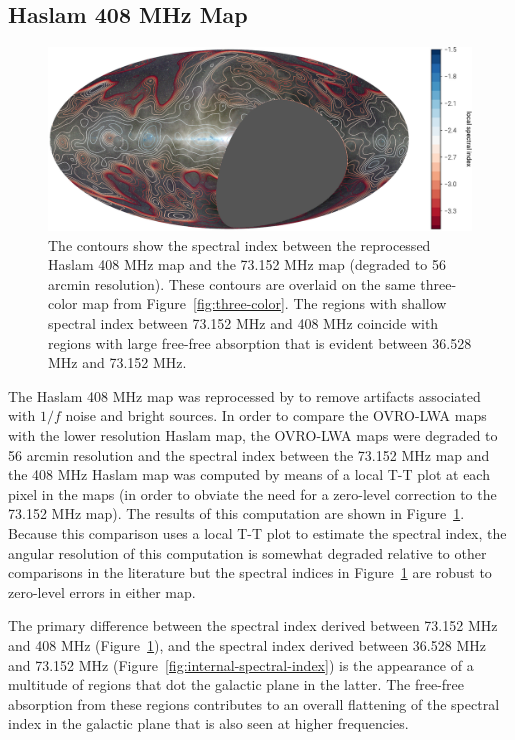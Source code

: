 \documentclass[twocolumn]{aastex61}
\begin{document}
\subsection{Haslam 408 MHz Map}

\begin{figure}[t]
    \centering
    \includegraphics[height=0.32\textheight]{figures/haslam/haslam-spectral-index}
    \caption{
        The contours show the spectral index between the reprocessed Haslam 408 MHz map and the
        73.152 MHz map (degraded to 56 arcmin resolution). These contours are overlaid on the same
        three-color map from Figure~\ref{fig:three-color}. The regions with shallow spectral index
        between 73.152 MHz and 408 MHz coincide with regions with large free-free absorption that is
        evident between 36.528 MHz and 73.152 MHz.
    }
    \label{fig:haslam-spectral-index}
\end{figure}

The Haslam 408 MHz map \citep{1981A&A...100..209H, 1982A&AS...47....1H} was reprocessed by
\citet{2015MNRAS.451.4311R} to remove artifacts associated with $1/f$ noise and bright sources. In
order to compare the OVRO-LWA maps with the lower resolution Haslam map, the OVRO-LWA maps were
degraded to 56 arcmin resolution and the spectral index between the 73.152 MHz map and the 408 MHz
Haslam map was computed by means of a local T-T plot at each pixel in the maps (in order to obviate
the need for a zero-level correction to the 73.152 MHz map). The results of this computation are
shown in Figure~\ref{fig:haslam-spectral-index}. Because this comparison uses a local T-T plot to
estimate the spectral index, the angular resolution of this computation is somewhat degraded
relative to other comparisons in the literature but the spectral indices in
Figure~\ref{fig:haslam-spectral-index} are robust to zero-level errors in either map.

The primary difference between the spectral index derived between 73.152 MHz and 408 MHz
(Figure~\ref{fig:haslam-spectral-index}), and the spectral index derived between 36.528 MHz and
73.152 MHz (Figure~\ref{fig:internal-spectral-index}) is the appearance of a multitude of 
regions that dot the galactic plane in the latter. The free-free absorption from these 
regions contributes to an overall flattening of the spectral index in the galactic plane that is
also seen at higher frequencies.
\end{document}
